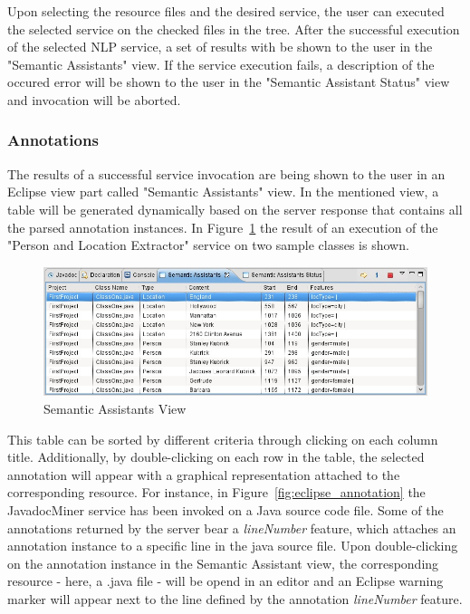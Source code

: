 Upon selecting the resource files and the desired service, the user can executed
the selected service on the checked files in the tree. After the successful
execution of the selected NLP service, a set of results with be shown to the
user in the "Semantic Assistants" view. If the service execution fails, a
description of the occured error will be shown to the user in the "Semantic
Assistant Status" view and invocation will be aborted.

\subsubsection{Annotations}
The results of a successful service invocation are being shown to the user in an
Eclipse view part called "Semantic Assistants" view. In the mentioned view, a
table will be generated dynamically based on the server response that contains
all the parsed annotation instances. In Figure~\ref{fig:eclipse_saView} the
result of an execution of the "Person and Location Extractor" service on two
sample classes is shown.
\begin{figure}[htb]
\begin{center}
  \includegraphics[width=1\textwidth]{pictures/eclipse_saView.jpg}
  \caption{Semantic Assistants View}
  \label{fig:eclipse_saView}
\end{center}
\end{figure}

This table can be sorted by different criteria through clicking on each column
title. Additionally, by double-clicking on each row in the table, the selected
annotation will appear with a graphical representation attached to the
corresponding resource. For instance, in Figure~\ref{fig:eclipse_annotation} the
JavadocMiner service has been invoked on a Java source code file. Some of the
annotations returned by the server bear a \emph{lineNumber} feature, which
attaches an annotation instance to a specific line in the java source file. Upon
double-clicking on the annotation instance in the Semantic Assistant view, the
corresponding resource - here, a .java file - will be opend in an editor and an
Eclipse warning marker will appear next to the line defined by the annotation
\emph{lineNumber} feature.

